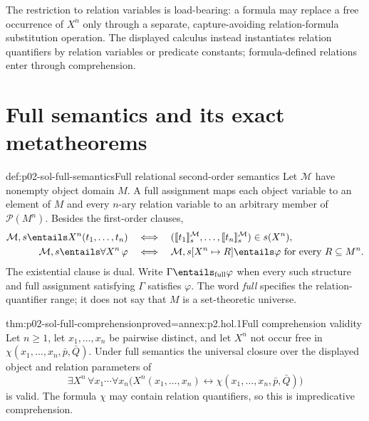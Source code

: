 The restriction to relation variables is load-bearing: a formula may replace
a free occurrence of \(X^n\) only through a separate, capture-avoiding
relation-formula substitution operation.  The displayed calculus instead
instantiates relation quantifiers by relation variables or predicate
constants; formula-defined relations enter through comprehension.

\section{Full semantics and its exact metatheorems}
\label{sec:p02-sol-full-semantics}

\begin{hbdefinition}{def:p02-sol-full-semantics}{Full relational second-order semantics}
Let \(\mathcal M\) have nonempty object domain \(M\).  A full assignment
maps each object variable to an element of \(M\) and every \(n\)-ary
relation variable to an arbitrary member of \(\mathcal P(M^n)\).  Besides
the first-order clauses,
\[
\begin{aligned}
 \mathcal M,s\entails X^n(t_1,\ldots,t_n)
 &\quad\Longleftrightarrow\quad
 (\lbrack\!\lbrack t_1\rbrack\!\rbrack_s^{\mathcal M},\ldots,
  \lbrack\!\lbrack t_n\rbrack\!\rbrack_s^{\mathcal M})\in s(X^n),\\
 \mathcal M,s\entails\forall X^n\,\varphi
 &\quad\Longleftrightarrow\quad
 \mathcal M,s[X^n\mapsto R]\entails\varphi
 \text{ for every }R\subseteq M^n.
\end{aligned}
\]
The existential clause is dual.  Write
\(\Gamma\entails_{\mathrm{full}}\varphi\) when every such structure and
full assignment satisfying \(\Gamma\) satisfies \(\varphi\).  The word
\emph{full} specifies the relation-quantifier range; it does not say that
\(M\) is a set-theoretic universe.
\end{hbdefinition}

\begin{hbtheorem}{thm:p02-sol-full-comprehension}{proved=annex:p2.hol.1}{Full comprehension validity}
Let \(n\geq1\), let \(x_1,\ldots,x_n\) be pairwise distinct, and let
\(X^n\) not occur free in
\(\chi(x_1,\ldots,x_n,\bar p,\bar Q)\).  Under full semantics the
universal closure over the displayed object and relation parameters of
\[
 \exists X^n\,\forall x_1\cdots\forall x_n
 \bigl(X^n(x_1,\ldots,x_n)\leftrightarrow
       \chi(x_1,\ldots,x_n,\bar p,\bar Q)\bigr)
\]
is valid.  The formula \(\chi\) may contain relation quantifiers, so this
is impredicative comprehension.
\end{hbtheorem}

